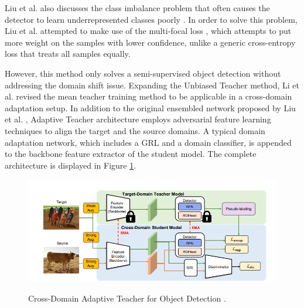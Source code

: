 Liu et al. also discusses the class imbalance problem that often causes the detector to learn underrepresented classes poorly \cite{Liu2021}. In order to solve this problem, Liu et al. attempted to make use of the multi-focal loss \cite{Lin2017}, which attempts to put more weight on the samples with lower confidence, unlike a generic cross-entropy loss that treats all samples equally. 

However, this method only solves a semi-supervised object detection without addressing the domain shift issue. Expanding the Unbiased Teacher method, Li et al. \cite{Li2021} revised the mean teacher training method to be applicable in a cross-domain adaptation setup. In addition to the original ensembled network proposed by Liu et al.  \cite{Liu2021}, Adaptive Teacher architecture employs adversarial feature learning techniques to align the target and the source domains. A typical domain adaptation network, which includes a GRL and a domain classifier, is appended to the backbone feature extractor of the student model. The complete architecture is displayed in Figure \ref{adapt_teacher}. 
 
\begin{figure}[htb]
	\begin{center}
		\includegraphics[width=16cm]{./adapt_teacher.png}
	\end{center}
	\caption{Cross-Domain Adaptive Teacher for Object Detection
\cite{Li2021}.}
	\begin{center}
		\label{adapt_teacher}
	\end{center}
\end{figure}

